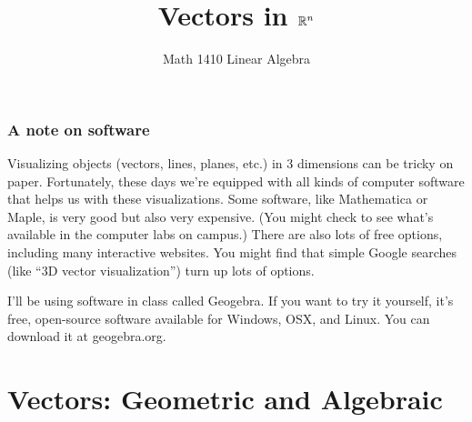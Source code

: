 \documentclass[11pt,t]{beamer}
\date{}
\author{Math 1410 Linear Algebra}
\title{Vectors in $\mathbb{R}^n$}
\begin{document}
\begin{frame}
\titlepage
\end{frame}

\begin{frame}
\frametitle{A note on software}

Visualizing objects (vectors, lines, planes, etc.) in 3 dimensions can be tricky on paper. Fortunately, these days we're equipped with all kinds of computer software that helps us with these visualizations. Some software, like Mathematica or Maple, is very good but also very expensive. (You might check to see what's available in the computer labs on campus.) There are also lots of free options, including many interactive websites. You might find that simple Google searches (like ``3D vector visualization'') turn up lots of options.

I'll be using software in class called \alert{Geogebra}. If you want to try it yourself, it's free, open-source software available for Windows, OSX, and Linux. You can download it at geogebra.org.
\end{frame}
\section{Vectors: Geometric and Algebraic}
\end{document}
